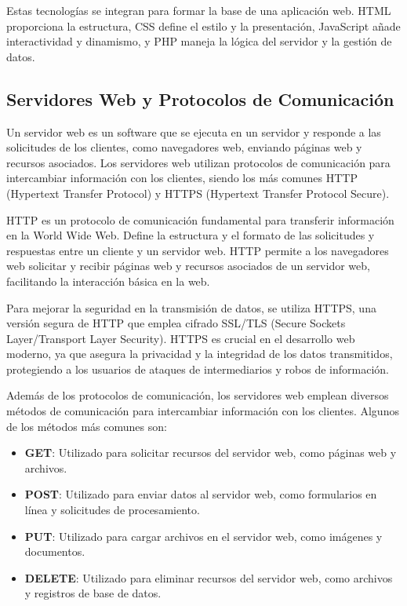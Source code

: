Estas tecnologías se integran para formar la base de una aplicación web. HTML proporciona la estructura, CSS define el estilo y la presentación, JavaScript añade interactividad y dinamismo, y PHP maneja la lógica del servidor y la gestión de datos. 

\subsection{Servidores Web y Protocolos de Comunicación}
Un servidor web es un software que se ejecuta en un servidor y responde a las solicitudes de los clientes, como navegadores web, enviando páginas web y recursos asociados. Los servidores web utilizan protocolos de comunicación para intercambiar información con los clientes, siendo los más comunes HTTP (Hypertext Transfer Protocol) y HTTPS (Hypertext Transfer Protocol Secure).

HTTP es un protocolo de comunicación fundamental para transferir información en la World Wide Web. Define la estructura y el formato de las solicitudes y respuestas entre un cliente y un servidor web. HTTP permite a los navegadores web solicitar y recibir páginas web y recursos asociados de un servidor web, facilitando la interacción básica en la web.

Para mejorar la seguridad en la transmisión de datos, se utiliza HTTPS, una versión segura de HTTP que emplea cifrado SSL/TLS (Secure Sockets Layer/Transport Layer Security). HTTPS es crucial en el desarrollo web moderno, ya que asegura la privacidad y la integridad de los datos transmitidos, protegiendo a los usuarios de ataques de intermediarios y robos de información.

Además de los protocolos de comunicación, los servidores web emplean diversos métodos de comunicación para intercambiar información con los clientes. Algunos de los métodos más comunes son:

\begin{itemize}
\item \textbf{GET}: Utilizado para solicitar recursos del servidor web, como páginas web y archivos.
\item \textbf{POST}: Utilizado para enviar datos al servidor web, como formularios en línea y solicitudes de procesamiento.
\item \textbf{PUT}: Utilizado para cargar archivos en el servidor web, como imágenes y documentos.
\item \textbf{DELETE}: Utilizado para eliminar recursos del servidor web, como archivos y registros de base de datos.
\end{itemize}

